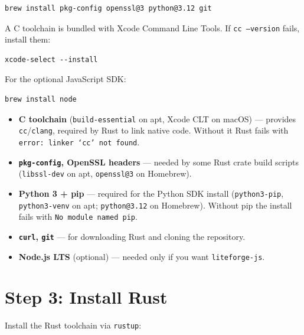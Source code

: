 \documentclass[11pt,letterpaper]{article}
\begin{document}
\begin{lstlisting}[style=bash]
brew install pkg-config openssl@3 python@3.12 git
\end{lstlisting}

A C toolchain is bundled with Xcode Command Line Tools. If
\texttt{cc --version} fails, install them:

\begin{lstlisting}[style=bash]
xcode-select --install
\end{lstlisting}

For the optional JavaScript SDK:

\begin{lstlisting}[style=bash]
brew install node
\end{lstlisting}

\begin{tcolorbox}[warnbox={Why these packages?}]
\begin{itemize}[nosep]
  \item \textbf{C toolchain} (\texttt{build-essential} on apt, Xcode CLT
    on macOS) --- provides \texttt{cc}/\texttt{clang}, required by Rust to
    link native code. Without it Rust fails with
    \texttt{error: linker `cc' not found}.
  \item \textbf{\texttt{pkg-config}, OpenSSL headers} --- needed by some
    Rust crate build scripts (\texttt{libssl-dev} on apt,
    \texttt{openssl@3} on Homebrew).
  \item \textbf{Python 3 + pip} --- required for the Python SDK install
    (\texttt{python3-pip}, \texttt{python3-venv} on apt;
    \texttt{python@3.12} on Homebrew). Without pip the install fails with
    \texttt{No module named pip}.
  \item \textbf{\texttt{curl}, \texttt{git}} --- for downloading Rust and
    cloning the repository.
  \item \textbf{Node.js LTS} (optional) --- needed only if you want
    \texttt{liteforge-js}.
\end{itemize}
\end{tcolorbox}

\newpage
\section{Step 3: Install Rust}

Install the Rust toolchain via \texttt{rustup}:
\end{document}
